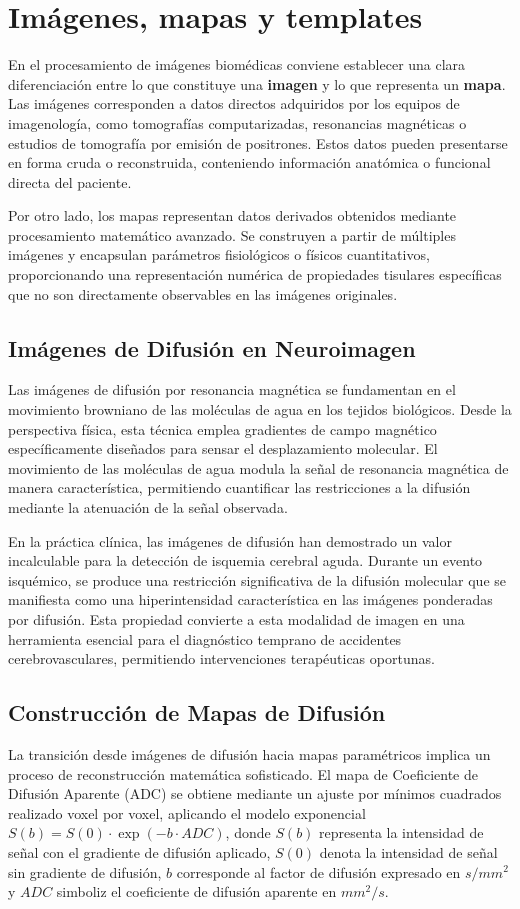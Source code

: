 \section{Imágenes, mapas y templates}
En el procesamiento de imágenes biomédicas conviene establecer una clara diferenciación entre lo que constituye una \textbf{imagen} y lo que representa un \textbf{mapa}. Las imágenes corresponden a datos directos adquiridos por los equipos de imagenología, como tomografías computarizadas, resonancias magnéticas o estudios de tomografía por emisión de positrones. Estos datos pueden presentarse en forma cruda o reconstruida, conteniendo información anatómica o funcional directa del paciente.

Por otro lado, los mapas representan datos derivados obtenidos mediante procesamiento matemático avanzado. Se construyen a partir de múltiples imágenes y encapsulan parámetros fisiológicos o físicos cuantitativos, proporcionando una representación numérica de propiedades tisulares específicas que no son directamente observables en las imágenes originales.

\subsection{Imágenes de Difusión en Neuroimagen}
Las imágenes de difusión por resonancia magnética se fundamentan en el movimiento browniano de las moléculas de agua en los tejidos biológicos. Desde la perspectiva física, esta técnica emplea gradientes de campo magnético específicamente diseñados para sensar el desplazamiento molecular. El movimiento de las moléculas de agua modula la señal de resonancia magnética de manera característica, permitiendo cuantificar las restricciones a la difusión mediante la atenuación de la señal observada.

En la práctica clínica, las imágenes de difusión han demostrado un valor incalculable para la detección de isquemia cerebral aguda. Durante un evento isquémico, se produce una restricción significativa de la difusión molecular que se manifiesta como una hiperintensidad característica en las imágenes ponderadas por difusión. Esta propiedad convierte a esta modalidad de imagen en una herramienta esencial para el diagnóstico temprano de accidentes cerebrovasculares, permitiendo intervenciones terapéuticas oportunas.

\subsection{Construcción de Mapas de Difusión}
La transición desde imágenes de difusión hacia mapas paramétricos implica un proceso de reconstrucción matemática sofisticado. El mapa de Coeficiente de Difusión Aparente (ADC) se obtiene mediante un ajuste por mínimos cuadrados realizado voxel por voxel, aplicando el modelo exponencial $S(b) = S(0) \cdot \exp(-b \cdot ADC)$, donde $S(b)$ representa la intensidad de señal con el gradiente de difusión aplicado, $S(0)$ denota la intensidad de señal sin gradiente de difusión, $b$ corresponde al factor de difusión expresado en $s/mm^2$ y $ADC$ simboliz el coeficiente de difusión aparente en $mm^2/s$.

